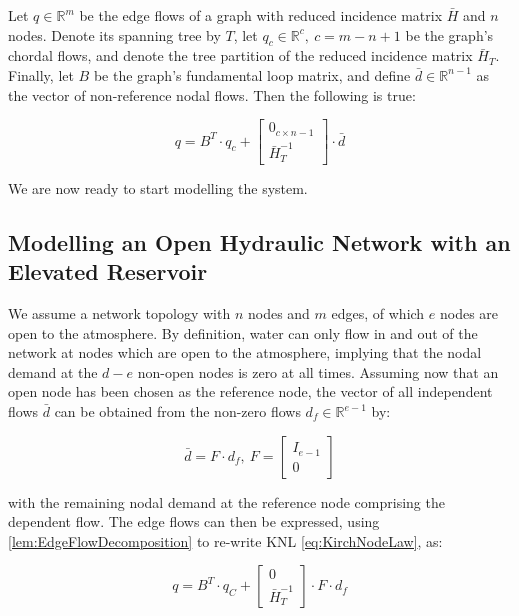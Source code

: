 \begin{lemma}\label{lem:EdgeFlowDecomposition}
	Let $q \in \mathbb{R}^m$ be the edge flows of a graph with reduced incidence matrix $\bar{H}$ and $n$ nodes. Denote its spanning tree by $T$, let $q_c \in \mathbb{R}^c, \ c = m-n+1$ be the graph's chordal flows, and denote the tree partition of the reduced incidence matrix $\bar{H}_T$. Finally, let $B$ be the graph's fundamental loop matrix, and define $\bar{d} \in \mathbb{R}^{n-1}$ as the vector of non-reference nodal flows. Then the following is true:
	
	\begin{equation}\label{eq:EdgeFlowDecomposition}
		q = B^T\cdot q_c +
		\begin{bmatrix}
			0_{c \times n-1} \\ \bar{H}_T^{-1} 
		\end{bmatrix}
		\cdot \bar{d}
	\end{equation}
\end{lemma}

We are now ready to start modelling the system.

\subsection{Modelling an Open Hydraulic Network with an Elevated Reservoir}\label{subsec:ModelWithTank}

We assume a network topology with $n$ nodes and $m$ edges, of which $e$ nodes are open to the atmosphere. By definition, water can only flow in and out of the network at nodes which are open to the atmosphere, implying that the nodal demand at the $d-e$ non-open nodes is zero at all times. Assuming now that an open node has been chosen as the reference node, the vector of all independent flows $\bar{d}$ can be obtained from the non-zero flows $d_f \in \mathbb{R}^{e-1}$ by:

\begin{equation}\label{eq:IndependentFlows}
	\bar{d} = F\cdot d_f, \ F = \begin{bmatrix}
		I_{e-1} \\ 0
	\end{bmatrix}
\end{equation}

with the remaining nodal demand at the reference node comprising the dependent flow. The edge flows can then be expressed, using \cref{lem:EdgeFlowDecomposition} to re-write KNL \cref{eq:KirchNodeLaw}, as:

\begin{equation}\label{eq:EdgeFlows}
	q = B^T\cdot q_C +
	\begin{bmatrix} 0 \\ \bar{H}_T^{-1} \end{bmatrix} \cdot F \cdot d_f
\end{equation}

